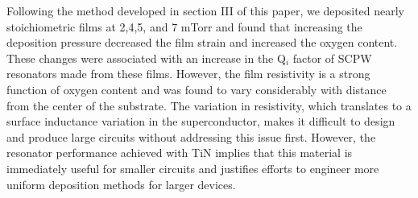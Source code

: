 Following the method developed in section III of this paper, we deposited nearly stoichiometric films at 2,4,5, and 7 mTorr and found that increasing the deposition pressure decreased the film strain and increased the oxygen content.  These changes were associated with an increase in the Q$_{i}$ factor of SCPW resonators made from these films.  However, the film resistivity is a strong function of oxygen content and was found to vary considerably with distance from the center of the substrate.  The variation in resistivity, which translates to a surface inductance variation in the superconductor, makes it difficult to design and produce large circuits without addressing this issue first.  However, the resonator performance achieved with TiN implies that this material is immediately useful for smaller circuits and justifies efforts to engineer more uniform deposition methods for larger devices.

%